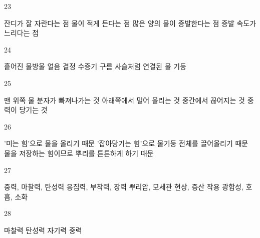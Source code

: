 \documentclass[fs9,seriesRus]{korfarm-base}
\begin{document}
\begin{kfSentenceUnit}{23}{}
\begin{kfChoices}
\kfChoice 잔디가 잘 자란다는 점
\kfChoice 물이 적게 든다는 점
\kfChoice 많은 양의 물이 증발한다는 점
\kfChoice 증발 속도가 느리다는 점
\end{kfChoices}
\end{kfSentenceUnit}

\begin{kfSentenceUnit}{24}{}
\begin{kfChoices}
\kfChoice 흩어진 물방울
\kfChoice 얼음 결정
\kfChoice 수증기 구름
\kfChoice 사슬처럼 연결된 물 기둥
\end{kfChoices}
\end{kfSentenceUnit}

\begin{kfSentenceUnit}{25}{}
\begin{kfChoices}
\kfChoice 맨 위쪽 물 분자가 빠져나가는 것
\kfChoice 아래쪽에서 밀어 올리는 것
\kfChoice 중간에서 끊어지는 것
\kfChoice 중력이 당기는 것
\end{kfChoices}
\end{kfSentenceUnit}

\begin{kfSentenceUnit}{26}{}
\begin{kfChoices}
\kfChoice '미는 힘'으로 물을 올리기 때문
\kfChoice '잡아당기는 힘'으로 물기둥 전체를 끌어올리기 때문
\kfChoice 물을 저장하는 힘이므로
\kfChoice 뿌리를 튼튼하게 하기 때문
\end{kfChoices}
\end{kfSentenceUnit}

\begin{kfSentenceUnit}{27}{}
\begin{kfChoices}
\kfChoice 중력, 마찰력, 탄성력
\kfChoice 응집력, 부착력, 장력
\kfChoice 뿌리압, 모세관 현상, 증산 작용
\kfChoice 광합성, 호흡, 소화
\end{kfChoices}
\end{kfSentenceUnit}

\begin{kfSentenceUnit}{28}{}
\begin{kfChoices}
\kfChoice 마찰력
\kfChoice 탄성력
\kfChoice 자기력
\kfChoice 중력
\end{kfChoices}
\end{kfSentenceUnit}
\end{document}
